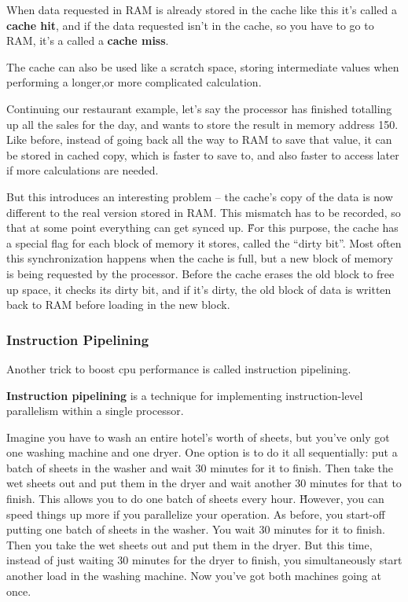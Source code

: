 When data requested in RAM is already stored in the cache like this it's called a \textbf{cache hit}, and if the data
requested isn't in the cache, so you have to go to RAM, it's a called a \textbf{cache miss}.
\ed

The cache can also be used like a scratch space, storing intermediate values when performing a longer,or more
complicated calculation.

\be
Continuing our restaurant example, let's say the processor has finished totalling up all the sales for the day,
and wants to store the result in memory address 150. Like before, instead of going back all the way to RAM to save
that value, it can be stored in cached copy, which is faster to save to, and also faster to access later if more
calculations are needed.
\ee

But this introduces an interesting problem -- the cache's copy of the data is now different to the real version
stored in RAM. This mismatch has to be recorded, so that at some point everything can get synced up. \v

For this purpose, the cache has a special flag for each block of memory it stores, called the ``dirty bit''. Most
often this synchronization happens when the cache is full, but a new block of memory is being requested by the
processor. Before the cache erases the old block to free up space, it checks its dirty bit, and if it's dirty, the
old block of data is written back to RAM before loading in the new block.

\subsubsection{Instruction Pipelining}

Another trick to boost cpu performance is called instruction pipelining.

\textbf{Instruction pipelining} is a technique for implementing instruction-level parallelism within a single processor.
\ed

\be
Imagine you have to wash an entire hotel's worth of sheets, but you've only got one washing machine and one dryer.
One option is to do it all sequentially: put a batch of sheets in the washer and wait 30 minutes for it to finish.
Then take the wet sheets out and put them in the dryer and wait another 30 minutes for that to finish. This allows
you to do one batch of sheets every hour. \v

However, you can speed things up more if you parallelize your operation. As before, you start-off putting one batch of
sheets in the washer. You wait 30 minutes for it to finish. Then you take the wet sheets out and put them in the
dryer. But this time, instead of just waiting 30 minutes for the dryer to finish, you simultaneously start another
load in the washing machine. Now you've got both machines going at once.
\ee

